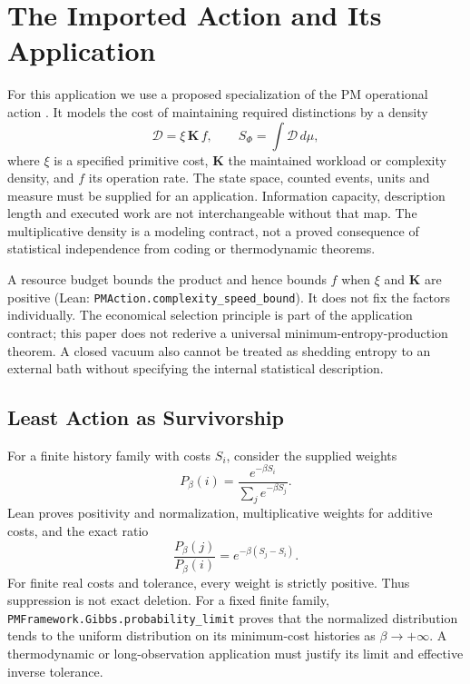 \section{The Imported Action and Its Application}
\label{sec:entropic_action}

For this application we use a proposed specialization of the PM operational action \cite{kate_meyer_persistence_2026}. It models the cost of maintaining required distinctions by a density
\begin{equation}
 \mathcal D=\xi\,\mathbf K\,f,\qquad S_\Phi=\int\mathcal D\,d\mu,
\end{equation}
where $\xi$ is a specified primitive cost, $\mathbf K$ the maintained workload or complexity density, and $f$ its operation rate. The state space, counted events, units and measure must be supplied for an application. Information capacity, description length and executed work are not interchangeable without that map. The multiplicative density is a modeling contract, not a proved consequence of statistical independence from coding or thermodynamic theorems.

A resource budget bounds the product and hence bounds $f$ when $\xi$ and $\mathbf K$ are positive (Lean: \nolinkurl{PMAction.complexity_speed_bound}). It does not fix the factors individually. The economical selection principle is part of the application contract; this paper does not rederive a universal minimum-entropy-production theorem. A closed vacuum also cannot be treated as shedding entropy to an external bath without specifying the internal statistical description.

\subsection{Least Action as Survivorship}
\label{sec:least_action}
For a finite history family with costs $S_i$, consider the supplied weights
\begin{equation}
 P_\beta(i)=\frac{e^{-\beta S_i}}{\sum_j e^{-\beta S_j}}.
 \label{eq:survival_prob}
\end{equation}
Lean proves positivity and normalization, multiplicative weights for additive costs, and the exact ratio
\begin{equation}
 \frac{P_\beta(j)}{P_\beta(i)}=e^{-\beta(S_j-S_i)}.
\end{equation}
For finite real costs and tolerance, every weight is strictly positive. Thus suppression is not exact deletion. For a fixed finite family, \nolinkurl{PMFramework.Gibbs.probability_limit} proves that the normalized distribution tends to the uniform distribution on its minimum-cost histories as $\beta\to+\infty$. A thermodynamic or long-observation application must justify its limit and effective inverse tolerance.

